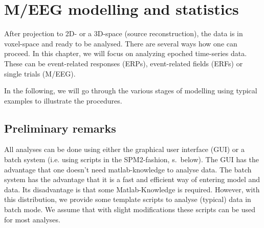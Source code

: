 \chapter{M/EEG modelling and statistics \label{Chap:eeg:stats}}

After projection to 2D- or a 3D-space (source reconstruction), the
data is in voxel-space and ready to be analysed. There are several
ways how one can proceed. In this chapter, we will focus on analyzing
epoched time-series data. These can be event-related responses (ERPs),
event-related fields (ERFs) or single trials (M/EEG). 

In the following, we will go through the various stages of modelling
using typical examples to illustrate the procedures.

\section{Preliminary remarks}
All analyses can be done using either the graphical user interface
(GUI) or a batch system (i.e. using scripts in the SPM2-fashion,
s.~below). The GUI has the advantage that one doesn't need
matlab-knowledge to analyse data. The batch system has the
advantage that it is a fast and efficient way of entering model and
data. Its disadvantage is that some Matlab-Knowledge is
required. However, with this distribution, we provide some template
scripts to analyse (typical) data in batch mode. We assume that with slight
modifications these scripts can be used for most analyses.

